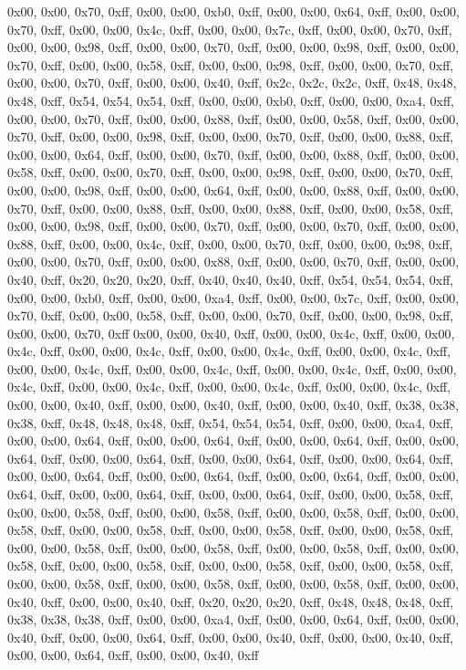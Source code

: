 0x00, 0x00, 0x70, 0xff, 0x00, 0x00, 0xb0, 0xff, 0x00, 0x00, 0x64, 0xff, 0x00, 0x00, 0x70, 0xff, 0x00, 0x00, 0x4c, 0xff, 0x00, 0x00, 0x7c, 0xff, 0x00, 0x00, 0x70, 0xff, 0x00, 0x00, 0x98, 0xff, 0x00, 0x00, 0x70, 0xff, 0x00, 0x00, 0x98, 0xff, 0x00, 0x00, 0x70, 0xff, 0x00, 0x00, 0x58, 0xff, 0x00, 0x00, 0x98, 0xff, 0x00, 0x00, 0x70, 0xff, 0x00, 0x00, 0x70, 0xff, 0x00, 0x00, 0x40, 0xff, 0x2c, 0x2c, 0x2c, 0xff, 0x48, 0x48, 0x48, 0xff, 0x54, 0x54, 0x54, 0xff, 0x00, 0x00, 0xb0, 0xff, 0x00, 0x00, 0xa4, 0xff, 0x00, 0x00, 0x70, 0xff, 0x00, 0x00, 0x88, 0xff, 0x00, 0x00, 0x58, 0xff, 0x00, 0x00, 0x70, 0xff, 0x00, 0x00, 0x98, 0xff, 0x00, 0x00, 0x70, 0xff, 0x00, 0x00, 0x88, 0xff, 0x00, 0x00, 0x64, 0xff, 0x00, 0x00, 0x70, 0xff, 0x00, 0x00, 0x88, 0xff, 0x00, 0x00, 0x58, 0xff, 0x00, 0x00, 0x70, 0xff, 0x00, 0x00, 0x98, 0xff, 0x00, 0x00, 0x70, 0xff, 0x00, 0x00, 0x98, 0xff, 0x00, 0x00, 0x64, 0xff, 0x00, 0x00, 0x88, 0xff, 0x00, 0x00, 0x70, 0xff, 0x00, 0x00, 0x88, 0xff, 0x00, 0x00, 0x88, 0xff, 0x00, 0x00, 0x58, 0xff, 0x00, 0x00, 0x98, 0xff, 0x00, 0x00, 0x70, 0xff, 0x00, 0x00, 0x70, 0xff, 0x00, 0x00, 0x88, 0xff, 0x00, 0x00, 0x4c, 0xff, 0x00, 0x00, 0x70, 0xff, 0x00, 0x00, 0x98, 0xff, 0x00, 0x00, 0x70, 0xff, 0x00, 0x00, 0x88, 0xff, 0x00, 0x00, 0x70, 0xff, 0x00, 0x00, 0x40, 0xff, 0x20, 0x20, 0x20, 0xff, 0x40, 0x40, 0x40, 0xff, 0x54, 0x54, 0x54, 0xff, 0x00, 0x00, 0xb0, 0xff, 0x00, 0x00, 0xa4, 0xff, 0x00, 0x00, 0x7c, 0xff, 0x00, 0x00, 0x70, 0xff, 0x00, 0x00, 0x58, 0xff, 0x00, 0x00, 0x70, 0xff, 0x00, 0x00, 0x98, 0xff, 0x00, 0x00, 0x70, 0xff
0x00, 0x00, 0x40, 0xff, 0x00, 0x00, 0x4c, 0xff, 0x00, 0x00, 0x4c, 0xff, 0x00, 0x00, 0x4c, 0xff, 0x00, 0x00, 0x4c, 0xff, 0x00, 0x00, 0x4c, 0xff, 0x00, 0x00, 0x4c, 0xff, 0x00, 0x00, 0x4c, 0xff, 0x00, 0x00, 0x4c, 0xff, 0x00, 0x00, 0x4c, 0xff, 0x00, 0x00, 0x4c, 0xff, 0x00, 0x00, 0x4c, 0xff, 0x00, 0x00, 0x4c, 0xff, 0x00, 0x00, 0x40, 0xff, 0x00, 0x00, 0x40, 0xff, 0x00, 0x00, 0x40, 0xff, 0x38, 0x38, 0x38, 0xff, 0x48, 0x48, 0x48, 0xff, 0x54, 0x54, 0x54, 0xff, 0x00, 0x00, 0xa4, 0xff, 0x00, 0x00, 0x64, 0xff, 0x00, 0x00, 0x64, 0xff, 0x00, 0x00, 0x64, 0xff, 0x00, 0x00, 0x64, 0xff, 0x00, 0x00, 0x64, 0xff, 0x00, 0x00, 0x64, 0xff, 0x00, 0x00, 0x64, 0xff, 0x00, 0x00, 0x64, 0xff, 0x00, 0x00, 0x64, 0xff, 0x00, 0x00, 0x64, 0xff, 0x00, 0x00, 0x64, 0xff, 0x00, 0x00, 0x64, 0xff, 0x00, 0x00, 0x64, 0xff, 0x00, 0x00, 0x58, 0xff, 0x00, 0x00, 0x58, 0xff, 0x00, 0x00, 0x58, 0xff, 0x00, 0x00, 0x58, 0xff, 0x00, 0x00, 0x58, 0xff, 0x00, 0x00, 0x58, 0xff, 0x00, 0x00, 0x58, 0xff, 0x00, 0x00, 0x58, 0xff, 0x00, 0x00, 0x58, 0xff, 0x00, 0x00, 0x58, 0xff, 0x00, 0x00, 0x58, 0xff, 0x00, 0x00, 0x58, 0xff, 0x00, 0x00, 0x58, 0xff, 0x00, 0x00, 0x58, 0xff, 0x00, 0x00, 0x58, 0xff, 0x00, 0x00, 0x58, 0xff, 0x00, 0x00, 0x58, 0xff, 0x00, 0x00, 0x58, 0xff, 0x00, 0x00, 0x40, 0xff, 0x00, 0x00, 0x40, 0xff, 0x20, 0x20, 0x20, 0xff, 0x48, 0x48, 0x48, 0xff, 0x38, 0x38, 0x38, 0xff, 0x00, 0x00, 0xa4, 0xff, 0x00, 0x00, 0x64, 0xff, 0x00, 0x00, 0x40, 0xff, 0x00, 0x00, 0x64, 0xff, 0x00, 0x00, 0x40, 0xff, 0x00, 0x00, 0x40, 0xff, 0x00, 0x00, 0x64, 0xff, 0x00, 0x00, 0x40, 0xff
